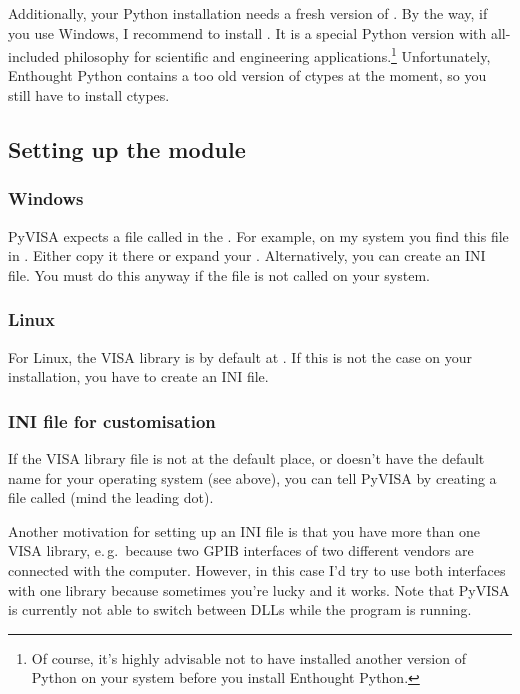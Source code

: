 \documentclass{howto}
\begin{document}
Additionally, your Python installation needs a fresh version of
.  By the way,
if you use Windows, I recommend to install .  It is a special Python version
with all-included philosophy for scientific and engineering
applications.\footnote{Of course, it's highly advisable not to have installed
  another version of Python on your system before you install Enthought
  Python.}  Unfortunately, Enthought Python contains a too old version of
ctypes at the moment, so you still have to install ctypes.


\subsection{Setting up the module}

\subsubsection{Windows}

PyVISA expects a file called  in the \@.  For
example, on my system you find this file in .
Either copy it there or expand your .  Alternatively, you can
create an INI file.  You must do this anyway if the file is not called
 on your system.


\subsubsection{Linux}

For Linux, the VISA library is by default at
.  If this is not the case on
your installation, you have to create an INI file.


\subsubsection{INI file for customisation}

If the VISA library file is not at the default place, or doesn't have the
default name for your operating system (see above), you can tell PyVISA by
creating a file called  (mind the leading dot).

Another motivation for setting up an INI file is that you have more than one
VISA library, e.\,g.\ because two GPIB interfaces of two different vendors are
connected with the computer.  However, in this case I'd try to use both
interfaces with one library because sometimes you're lucky and it works.  Note
that PyVISA is currently not able to switch between DLLs while the program is
running.
\end{document}
